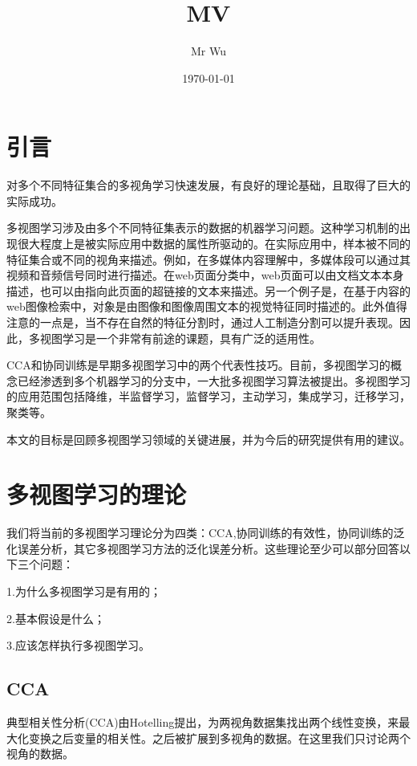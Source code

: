 \documentclass{ctexart}
\title{MV}
\author{Mr Wu}
\date{\today}
\begin{document}
	\maketitle
	\section{引言}
	对多个不同特征集合的多视角学习快速发展，有良好的理论基础，且取得了巨大的实际成功。
	
	多视图学习涉及由多个不同特征集表示的数据的机器学习问题。这种学习机制的出现很大程度上是被实际应用中数据的属性所驱动的。在实际应用中，样本被不同的特征集合或不同的视角来描述。例如，在多媒体内容理解中，多媒体段可以通过其视频和音频信号同时进行描述。在web页面分类中，web页面可以由文档文本本身描述，也可以由指向此页面的超链接的文本来描述。另一个例子是，在基于内容的web图像检索中，对象是由图像和图像周围文本的视觉特征同时描述的。此外值得注意的一点是，当不存在自然的特征分割时，通过人工制造分割可以提升表现。因此，多视图学习是一个非常有前途的课题，具有广泛的适用性。
	
	CCA和协同训练是早期多视图学习中的两个代表性技巧。目前，多视图学习的概念已经渗透到多个机器学习的分支中，一大批多视图学习算法被提出。多视图学习的应用范围包括降维，半监督学习，监督学习，主动学习，集成学习，迁移学习，聚类等。
	
	本文的目标是回顾多视图学习领域的关键进展，并为今后的研究提供有用的建议。
	\section{多视图学习的理论}
	我们将当前的多视图学习理论分为四类：CCA,协同训练的有效性，协同训练的泛化误差分析，其它多视图学习方法的泛化误差分析。这些理论至少可以部分回答以下三个问题：
	
	1.为什么多视图学习是有用的；
	
	2.基本假设是什么；
	
	3.应该怎样执行多视图学习。
	\subsection{CCA}
	典型相关性分析(CCA)由Hotelling提出，为两视角数据集找出两个线性变换，来最大化变换之后变量的相关性。之后被扩展到多视角的数据。在这里我们只讨论两个视角的数据。
	
	
\end{document}
